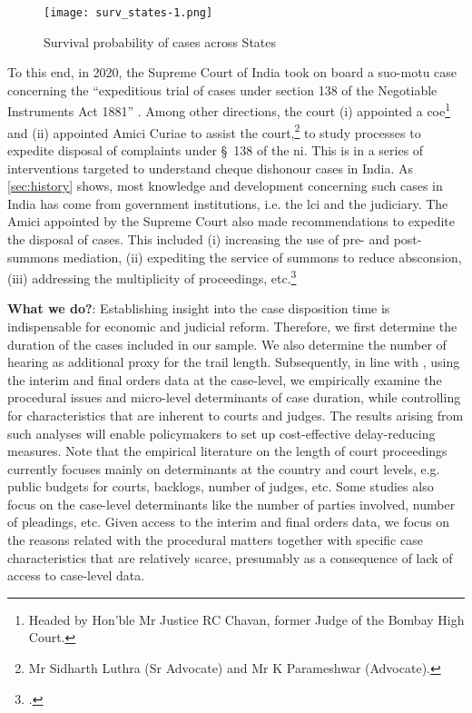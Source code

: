 \begin{figure}[h]
 \centering
 \caption{Survival probability of cases across States}\label{fig:stateSurvival}
 \texttt{[image: surv\_states-1.png]}
\end{figure}

To this end, in 2020, the Supreme Court of India took on board a suo-motu case concerning the “expeditious trial of cases under section 138 of the Negotiable Instruments Act 1881” \autocite{sc2020_138}. Among other directions, the court (i) appointed a \gls{coe}\footnote{Headed by Hon’ble Mr Justice RC Chavan, former Judge of the Bombay High Court.} and (ii) appointed Amici Curiae to assist the court,\footnote{Mr Sidharth Luthra (Sr Advocate) and Mr K Parameshwar (Advocate).} to study processes to expedite disposal of complaints under \S~138 of the \gls{ni}. This is in a series of interventions targeted to understand cheque dishonour cases in India. As \cref{sec:history} shows, most knowledge and development concerning such cases in India has come from government institutions, i.e. the \gls{lci} and the judiciary. The Amici appointed by the Supreme Court also made recommendations to expedite the disposal of cases. This included (i) increasing the use of pre- and post-summons mediation, (ii) expediting the service of summons to reduce absconsion, (iii) addressing the multiplicity of proceedings, etc.\footcite[For details see ]{amicus2020_submission} 

\textbf{What we do?}: 
Establishing insight into the case disposition time is indispensable for economic and judicial reform. Therefore, we first determine the duration of the cases included in our sample. We also determine the number of hearing as additional proxy for the trail length. Subsequently, in line with \cite{bielenetal2015}, using the interim and final orders data at the case-level, we empirically examine the procedural issues and micro-level determinants of case duration, while controlling for characteristics that are inherent to courts and judges. The results arising from such analyses will enable policymakers to set up cost-effective delay-reducing measures. Note that the empirical literature on the length of court proceedings currently focuses mainly on determinants at the country and court levels, e.g. public budgets for courts, backlogs, number of judges, etc. Some studies also focus on the case-level determinants like the number of parties involved, number of pleadings, etc. Given access to the interim and final orders data, we focus on the reasons related with the procedural matters together with specific case characteristics that are relatively scarce, presumably as a consequence of lack of access to case-level data.

